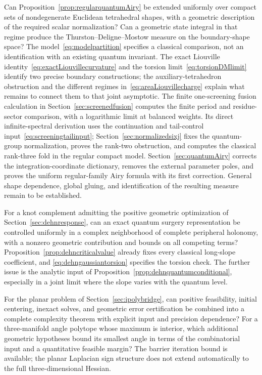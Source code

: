 \begin{question}
Can Proposition~\ref{prop:regularquantumAiry} be extended uniformly
over compact sets of nondegenerate Euclidean tetrahedral shapes,
with a geometric description of the required scalar normalization?
Can a geometric state
integral in that regime produce the Thurston--Deligne--Mostow measure
on the boundary-shape space? The model~\eqref{eq:modelpartition}
specifies a classical comparison, not an identification with an
existing quantum invariant. The exact Liouville
identity~\eqref{eq:exactLiouvillecurvature} and the torsion
limit~\eqref{eq:torsionDMlimit} identify two precise boundary
constructions; the auxiliary-tetrahedron obstruction and the
different regimes in~\eqref{eq:areaLiouvillecharge} explain
what remains to connect them to that joint asymptotic.
The finite one-screening fusion calculation in
Section~\ref{sec:screenedfusion} computes the finite period and
residue-sector comparison, with a logarithmic limit at balanced
weights. Its direct infinite-spectral derivation uses the
continuation and tail-control input~\eqref{eq:screeningtailinput};
Section~\ref{sec:normalizedsixj} fixes the quantum-group
normalization, proves the rank-two obstruction, and computes
the classical rank-three fold in the regular compact model.
Section~\ref{sec:quantumAiry} corrects the integration-coordinate
dictionary, removes the external parameter poles, and proves the
uniform regular-family Airy formula with its first correction.
General shape dependence, global gluing, and identification of
the resulting measure remain to be established.
\end{question}

\begin{question}
For a knot complement admitting the positive geometric optimization
of Section~\ref{sec:dehnresponse}, can an exact quantum surgery
representation be controlled uniformly in a complex neighborhood
of complete peripheral holonomy, with a nonzero geometric contribution
and bounds on all competing terms? Proposition~\ref{prop:dehncriticalvalue}
already fixes every classical long-slope coefficient, and
\eqref{eq:dehngaussiantorsion} specifies the torsion check. The further
issue is the analytic input of
Proposition~\ref{prop:dehnquantumconditional}, especially in a joint
limit where the slope varies with the quantum level.
\end{question}


\begin{question}
For the planar problem of Section~\ref{sec:ipolybridge}, can positive
feasibility, initial centering, inexact solves, and geometric error
certification be combined into a complete complexity theorem with
explicit input and precision dependence? For a three-manifold angle
polytope whose maximum is interior, which additional geometric hypotheses
bound its smallest angle in terms of the combinatorial input and a
quantitative feasible margin? The barrier iteration bound is available;
the planar Laplacian sign structure does not extend automatically to
the full three-dimensional Hessian.
\end{question}

